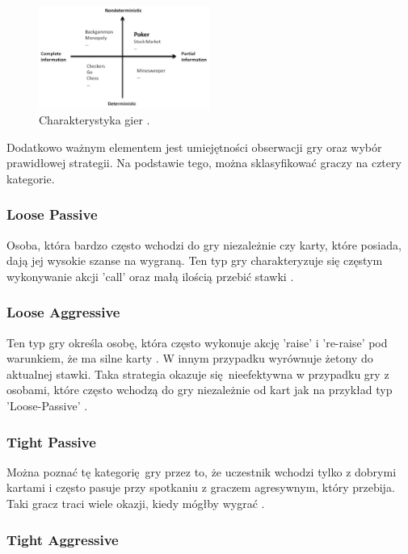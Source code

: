 \documentclass[12pt,oneside,a4paper]{report}
\begin{document}
\begin{figure}[h!]
            \center
           \includegraphics[width=0.5\textwidth]{./img/classification.pdf}
           \caption{Charakterystyka gier  \cite{poker}.}
\end{figure}

Dodatkowo ważnym elementem jest umiejętności obserwacji gry oraz wybór prawidłowej strategii. Na podstawie
tego, można sklasyfikować graczy na cztery kategorie. 

\subsubsection{Loose Passive}

Osoba, która bardzo często wchodzi do gry niezależnie czy karty, które posiada, dają jej
wysokie szanse na wygraną. Ten typ gry charakteryzuje się częstym wykonywanie akcji 'call' oraz
małą ilością przebić stawki \cite{class}. 

\subsubsection{Loose Aggressive}

Ten typ gry określa osobę, która często wykonuje akcję 'raise' i 're-raise' 
pod warunkiem, że ma silne karty \cite{class}. W innym przypadku wyrównuje żetony do aktualnej stawki.
Taka strategia okazuje się nieefektywna w przypadku gry z osobami, które często wchodzą do gry 
niezależnie od kart jak na przykład typ 'Loose-Passive' \cite{class}. 

\subsubsection{Tight Passive}

Można poznać tę kategorię gry przez to, że uczestnik wchodzi tylko z dobrymi kartami i często 
pasuje przy spotkaniu z graczem agresywnym, który przebija. Taki gracz traci wiele okazji, kiedy
mógłby wygrać \cite{class}. 

\subsubsection{Tight Aggressive}
\end{document}
